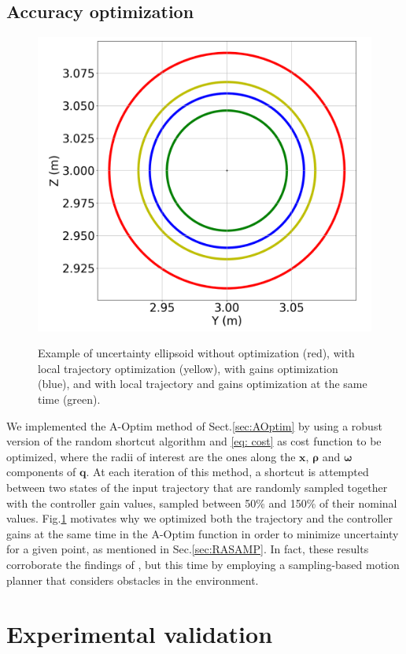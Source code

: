 \subsection{Accuracy optimization} \label{sec:AccOptSimu}

\begin{figure} [t]
    \centering
    {\includegraphics[width=0.5\linewidth]{figures/robust_accurate/accuracy_opti.png} }%
    \caption{Example of uncertainty ellipsoid without optimization (red), with local trajectory optimization (yellow), with gains optimization (blue), and with local trajectory and gains optimization at the same time (green).}%
    \label{fig: Acc opti}%
\end{figure}

We implemented the A-Optim method of Sect.\ref{sec:AOptim} by using a robust version of the random shortcut algorithm \cite{cShortcut} and \eqref{eq: cost} as cost function to be optimized, where the radii of interest are the ones along the $\boldsymbol{x}$, $\boldsymbol{\rho}$ and $\boldsymbol{\omega}$ components of $\boldsymbol{q}$.
At each iteration of this method, a shortcut is attempted between two states of the input trajectory that are randomly sampled together with the controller gain values, sampled between 50\% and 150\% of their nominal values.
Fig.\ref{fig: Acc opti} motivates why we optimized both the trajectory and the controller gains at the same time in the A-Optim function in order to minimize uncertainty for a given point, as mentioned in Sec.\ref{sec:RASAMP}. In fact, these results corroborate the findings of \cite{AliIROS}, but this time by employing a sampling-based motion planner that considers obstacles in the environment.

\section{Experimental validation} \label{sec:Experimental}

